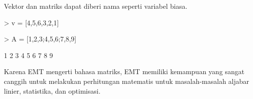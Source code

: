 \documentclass[a4paper,10pt]{article}
\begin{document}
\begin{eulernotebook}
\begin{eulercomment}
\begin{eulercomment}
\begin{eulercomment}
Vektor dan matriks dapat diberi nama seperti variabel biasa.
\end{eulercomment}
\begin{eulerprompt}
> v = [4,5,6,3,2,1]
\end{eulerprompt}
\begin{euleroutput}
  [4,  5,  6,  3,  2,  1]
\end{euleroutput}
\begin{eulerprompt}
> A = [1,2,3;4,5,6;7,8,9]
\end{eulerprompt}
\begin{euleroutput}
              1             2             3 
              4             5             6 
              7             8             9 
\end{euleroutput}
\begin{eulercomment}
Karena EMT mengerti bahasa matriks, EMT memiliki kemampuan yang sangat
canggih untuk melakukan perhitungan matematis untuk masalah-masalah
aljabar linier, statistika, dan optimisasi.


\end{eulercomment}
\end{eulercomment}
\end{eulercomment}
\end{eulernotebook}
\end{document}
